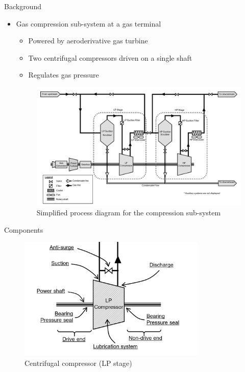 \documentclass{beamer}
\begin{document}
\begin{frame}[shrink]{Background}
  \begin{itemize}
    \item Gas compression sub-system at a gas terminal 
    \begin{itemize}
      \item Powered by aeroderivative gas turbine
      \item Two centrifugal compressors driven on a single shaft
      \item Regulates gas pressure
    \end{itemize}
    \begin{figure}
    	\centering
    	\includegraphics[width=1\textwidth]{process_diagram.png}
      \caption{Simplified process diagram for the compression sub-system}
    \end{figure}
  \end{itemize}
\end{frame}

\begin{frame}{Components}
  \begin{figure}
    \centering
    \includegraphics[width=0.8\textwidth]{lp-stage.PNG}
    \caption{Centrifugal compressor (LP stage)}
  \end{figure}
\end{frame}
\end{document}
